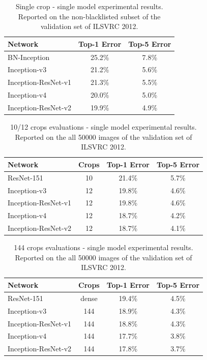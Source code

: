 \begin{table}
{\small
 \begin{center}
   \begin{tabular}[H]{|l|c|c|}
   \hline
   {\bf Network} & {\bf Top-1 Error} & {\bf Top-5 Error} \\
   \hline
   BN-Inception~\cite{ioffe2015batch} & 25.2\% & 7.8\% \\
   Inception-v3~\cite{szegedy2015rethinking} & 21.2\% & 5.6\% \\
   Inception-ResNet-v1 & 21.3\% & 5.5\% \\
   Inception-v4 & 20.0\% & 5.0\% \\
   Inception-ResNet-v2 & 19.9\% & 4.9\% \\
   \hline
   \end{tabular}
 \end{center}
 }
\caption{Single crop - single model experimental results. Reported on the
non-blacklisted subset of the validation set of ILSVRC 2012.}
\label{singlesingle}
\end{table}
\begin{table}
{\small
 \begin{center}
   \begin{tabular}[H]{|l|c|c|c|}
   \hline
   {\bf Network} & {Crops} & {\bf Top-1 Error} & {\bf Top-5 Error} \\
   \hline
   ResNet-151~\cite{he2015deep} & 10 & 21.4\% & 5.7\% \\
   Inception-v3~\cite{szegedy2015rethinking} & 12 & 19.8\% & 4.6\% \\
   Inception-ResNet-v1 & 12 & 19.8\% & 4.6\% \\
   Inception-v4 & 12 & 18.7\% & 4.2\% \\
   Inception-ResNet-v2 & 12 & 18.7\% & 4.1\% \\
   \hline
   \end{tabular}
 \end{center}
 }
\caption{10/12 crops evaluations - single model experimental results.
  Reported on the
all 50000 images of the validation set of ILSVRC 2012.}
\label{multisingle}
\end{table}
\begin{table}
{\small
 \begin{center}
   \begin{tabular}[H]{|l|c|c|c|}
   \hline
   {\bf Network} & {Crops} & {\bf Top-1 Error} & {\bf Top-5 Error} \\
   \hline
   ResNet-151~\cite{he2015deep} & dense & 19.4\% & 4.5\% \\
   Inception-v3~\cite{szegedy2015rethinking} & 144 & 18.9\% & 4.3\% \\
   Inception-ResNet-v1 & 144 & 18.8\% & 4.3\% \\
   Inception-v4 & 144 & 17.7\% & 3.8\% \\
   Inception-ResNet-v2 & 144 & 17.8\% & 3.7\% \\
   \hline
   \end{tabular}
 \end{center}
 }
\caption{144 crops evaluations - single model experimental results.
  Reported on the all 50000 images of the validation set of ILSVRC 2012.}
\label{manysingle}
\end{table}
